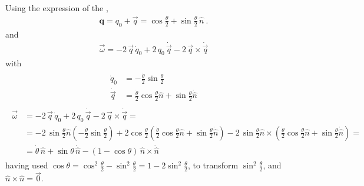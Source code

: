 \documentclass[letterpaper,10pt,english]{jupyterBook}
\begin{document}
\sphinxAtStartPar
Using the expression of the {\hyperref[\detokenize{ch/kinematics-rotations-param-quaternions:classical-mechanics-kinematics-rotations-quaternions-angular-velocity}]{}},
\begin{equation*}
\begin{split}\mathbf{q} = q_0 + \vec{q} = \cos \frac{\theta}{2} + \sin \frac{\theta}{2} \, \hat{n} \ .\end{split}
\end{equation*}
\sphinxAtStartPar
and
\begin{equation*}
\begin{split}\vec{\omega} = - 2 \, \vec{q} \, \dot{q}_0 + 2 \, q_0 \, \dot{\vec{q}} - 2 \, \vec{q} \times \dot{\vec{q}}\end{split}
\end{equation*}
\sphinxAtStartPar
with
\begin{equation*}
\begin{split}\begin{aligned}
  \dot{q}_0     & = - \frac{\dot{\theta}}{2} \sin \frac{\theta}{2} \\
  \dot{\vec{q}} & = \frac{\dot{\theta}}{2} \cos \frac{\theta}{2} \hat{n} + \sin \frac{\theta}{2} \dot{\hat{n}}
\end{aligned}\end{split}
\end{equation*}\begin{equation*}
\begin{split}\begin{aligned}
  \vec{\omega}
  & = - 2 \, \vec{q} \, \dot{q}_0 + 2 \, q_0 \, \dot{\vec{q}} - 2 \, \vec{q} \times \dot{\vec{q}} = \\
  & = - 2 \, \sin \frac{\theta}{2} \hat{n} \left( -\frac{\dot{\theta}}{2} \sin \frac{\theta}{2} \right) + 2 \cos \frac{\theta}{2} \left( \frac{\dot{\theta}}{2} \cos \frac{\theta}{2} \hat{n} + \sin \frac{\theta}{2} \dot{\hat{n}} \right) - 2 \, \sin \frac{\theta}{2} \hat{n} \times \left(  \frac{\dot{\theta}}{2} \cos \frac{\theta}{2} \hat{n} + \sin \frac{\theta}{2} \dot{\hat{n}} \right) = \\
  & = \dot{\theta} \,  \hat{n} + \sin \theta \, \dot{\hat{n}} - \left( 1 - \cos \theta \right) \,  \hat{n}\times \dot{\hat{n}}
\end{aligned}\end{split}
\end{equation*}
\sphinxAtStartPar
having used \(\cos \theta = \cos^2 \frac{\theta}{2} - \sin^2 \frac{\theta}{2} = 1 - 2 \sin^2 \frac{\theta}{2}\), to transform \(\sin^2 \frac{\theta}{2}\), and \(\hat{n} \times \hat{n} = \vec{0}\).
\end{document}
